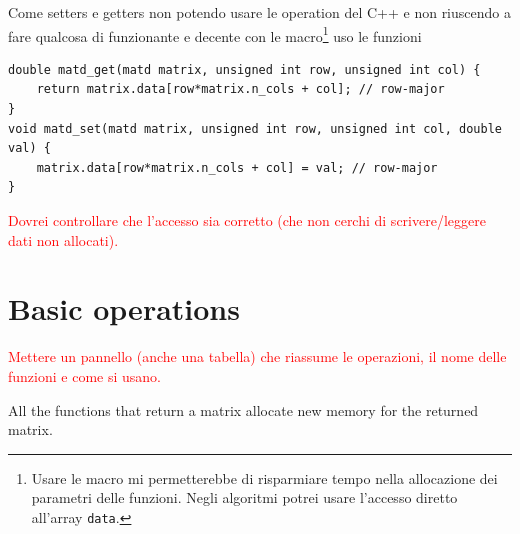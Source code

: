 \documentclass[10pt]{article}
\begin{document}
Come setters e getters non potendo usare le operation del C++ e non riuscendo a fare qualcosa di funzionante e decente con le macro\footnote{Usare le macro mi permetterebbe di risparmiare tempo nella allocazione dei parametri delle funzioni. Negli algoritmi potrei usare l'accesso diretto all'array \texttt{data}.} uso le funzioni
\begin{lstlisting}
double matd_get(matd matrix, unsigned int row, unsigned int col) {
	return matrix.data[row*matrix.n_cols + col]; // row-major
}
void matd_set(matd matrix, unsigned int row, unsigned int col, double val) {
	matrix.data[row*matrix.n_cols + col] = val; // row-major
}
\end{lstlisting}
\textcolor{red}{Dovrei controllare che l'accesso sia corretto (che non cerchi di scrivere/leggere dati non allocati).}



\section{Basic operations}

\textcolor{red}{Mettere un pannello (anche una tabella) che riassume le operazioni, il nome delle funzioni e come si usano.}

All the functions that return a matrix allocate new memory for the returned matrix.
\end{document}
